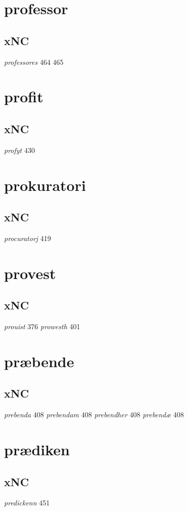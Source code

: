 \documentclass[a4paper,twocolumn]{article}
\begin{document}
\section{professor}
\label{sec:org60af333}
\subsection{xNC}
\label{sec:org26be1bf}
\emph{professores} 464 465 
\section{profit}
\label{sec:org136f4df}
\subsection{xNC}
\label{sec:orgcf8443c}
\emph{profyt} 430 
\section{prokuratori}
\label{sec:org08eb75f}
\subsection{xNC}
\label{sec:org11e7f6a}
\emph{procuratorj} 419 
\section{provest}
\label{sec:org105737d}
\subsection{xNC}
\label{sec:org9d9866e}
\emph{prouist} 376 \emph{prowesth} 401 
\section{præbende}
\label{sec:org4b7edba}
\subsection{xNC}
\label{sec:orga356ea5}
\emph{prebenda} 408 \emph{prebendam} 408 \emph{prebendher} 408 \emph{prebendæ} 408 
\section{prædiken}
\label{sec:orge790308}
\subsection{xNC}
\label{sec:org956a278}
\emph{predickenn} 451 
\end{document}
